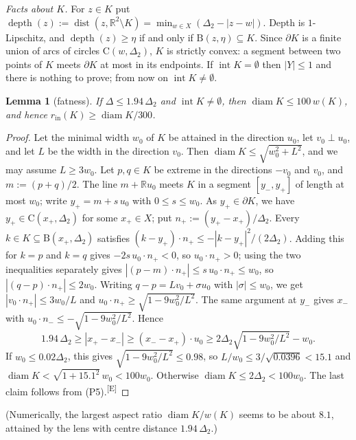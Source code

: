 \documentclass[11pt]{amsart}
\newtheorem{lemma}[theorem]{Lemma}
\theoremstyle{definition}
\theoremstyle{remark}
\newcommand{\R}{\mathbb{R}}
\newcommand{\Dt}{\Delta_2}
\newcommand{\dist}{\operatorname{dist}}
\newcommand{\Cc}{\mathrm{C}}      %
\newcommand{\Dd}{\mathrm{B}}      %
\newcommand{\chk}[1]{\textsuperscript{[#1]}}
\begin{document}
\emph{Facts about $K$.} For $z\in K$ put $\operatorname{depth}(z):=\dist(z,\R^2\setminus K)=\min_{w\in X}(\Dt-|z-w|)$. Depth is $1$-Lipschitz, and $\operatorname{depth}(z)\ge\eta$ if and only if $\Dd(z,\eta)\subseteq K$. Since $\partial K$ is a finite union of arcs of circles $\Cc(w,\Dt)$, $K$ is strictly convex: a segment between two points of $K$ meets $\partial K$ at most in its endpoints. If $\operatorname{int}K=\emptyset$ then $|Y|\le1$ and there is nothing to prove; from now on $\operatorname{int}K\neq\emptyset$.

\begin{lemma}[fatness]\label{lem:fat}
If $\Delta\le1.94\,\Dt$ and $\operatorname{int}K\neq\emptyset$, then $\operatorname{diam}K\le100\,w(K)$, and hence $r_{\mathrm{in}}(K)\ge\operatorname{diam}K/300$.
\end{lemma}
\begin{proof}
Let the minimal width $w_0$ of $K$ be attained in the direction $u_0$, let $v_0\perp u_0$, and let $L$ be the width in the direction $v_0$. Then $\operatorname{diam}K\le\sqrt{w_0^2+L^2}$, and we may assume $L\ge3w_0$. Let $p,q\in K$ be extreme in the directions $-v_0$ and $v_0$, and $m:=(p+q)/2$. The line $m+\R u_0$ meets $K$ in a segment $[y_-,y_+]$ of length at most $w_0$; write $y_+=m+s\,u_0$ with $0\le s\le w_0$. As $y_+\in\partial K$, we have $y_+\in\Cc(x_+,\Dt)$ for some $x_+\in X$; put $n_+:=(y_+-x_+)/\Dt$. Every $k\in K\subseteq\Dd(x_+,\Dt)$ satisfies $(k-y_+)\cdot n_+\le-|k-y_+|^2/(2\Dt)$. Adding this for $k=p$ and $k=q$ gives $-2s\,u_0\cdot n_+<0$, so $u_0\cdot n_+>0$; using the two inequalities separately gives $|(p-m)\cdot n_+|\le s\,u_0\cdot n_+\le w_0$, so $|(q-p)\cdot n_+|\le2w_0$. Writing $q-p=Lv_0+\sigma u_0$ with $|\sigma|\le w_0$, we get $|v_0\cdot n_+|\le3w_0/L$ and $u_0\cdot n_+\ge\sqrt{1-9w_0^2/L^2}$. The same argument at $y_-$ gives $x_-$ with $u_0\cdot n_-\le-\sqrt{1-9w_0^2/L^2}$. Hence
\[
1.94\,\Dt\ge|x_+-x_-|\ge(x_--x_+)\cdot u_0\ge2\Dt\sqrt{1-9w_0^2/L^2}-w_0 .
\]
If $w_0\le0.02\Dt$, this gives $\sqrt{1-9w_0^2/L^2}\le0.98$, so $L/w_0\le3/\sqrt{0.0396}<15.1$ and $\operatorname{diam}K<\sqrt{1+15.1^2}\,w_0<100w_0$. Otherwise $\operatorname{diam}K\le2\Dt<100w_0$. The last claim follows from (P5).\chk{E}
\end{proof}
(Numerically, the largest aspect ratio $\operatorname{diam}K/w(K)$ seems to be about $8.1$, attained by the lens with centre distance $1.94\,\Dt$.)
\end{document}
